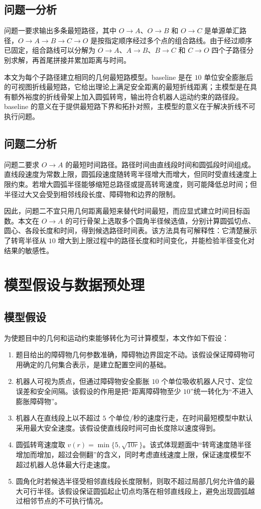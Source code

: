 \documentclass[UTF8,a4paper,12pt]{ctexart}
\begin{document}
\subsection{问题一分析}
问题一要求输出多条最短路径，其中 $O\to A$、$O\to B$ 和 $O\to C$ 是单源单汇路径，$O\to A\to B\to C\to O$ 是按指定顺序经过多个点的组合路线。由于经过顺序已固定，组合路线可以分解为 $O\to A$、$A\to B$、$B\to C$ 和 $C\to O$ 四个子路径分别求解，再首尾拼接并累加距离与时间。

本文为每个子路径建立相同的几何最短路模型。baseline 是在 $10$ 单位安全膨胀后的可视图折线最短路，它给出理论上满足安全距离的最短折线距离；主模型是在具有额外裕度的折线骨架上加入圆弧转弯，输出符合机器人运动约束的路径段。baseline 的意义在于提供最短路下界和拓扑对照，主模型的意义在于解决折线不可执行问题。

\subsection{问题二分析}
问题二要求 $O\to A$ 的最短时间路径。路径时间由直线段时间和圆弧段时间组成。直线段速度为常数上限，圆弧段速度随转弯半径增大而增大，但同时受直线速度上限约束。若增大圆弧半径能够缩短总路径或提高转弯速度，则可能降低总时间；但半径过大又会受到相邻线段长度、障碍物和边界的限制。

因此，问题二不宜只用几何距离最短来替代时间最短，而应显式建立时间目标函数。本文在 $O\to A$ 的可行骨架上选取多个圆角半径候选值，分别计算圆弧切点、圆心、各段长度和时间，得到候选路径时间表。该方法具有可解释性：它清楚展示了转弯半径从 $10$ 增大到上限过程中的路径长度和时间变化，并能检验半径变化对结果的敏感性。

\section{模型假设与数据预处理}
\subsection{模型假设}
为使题目中的几何和运动约束能够转化为可计算模型，本文作如下假设：
\begin{enumerate}[label=H\arabic*：]
    \item 题目给出的障碍物几何参数准确，障碍物边界固定不动。该假设保证障碍物可用确定的几何集合表示，是建立配置空间的基础。
    \item 机器人可视为质点，但通过障碍物安全膨胀 $10$ 个单位吸收机器人尺寸、定位误差和安全间隔。该假设的作用是把“距离障碍物至少 $10$”统一转化为“不进入膨胀障碍物”。
    \item 机器人在直线段上以不超过 $5$ 个单位/秒的速度行走，在时间最短模型中默认采用最大安全速度。该假设使直线段时间可由长度除以速度得到。
    \item 圆弧转弯速度取 $v(r)=\min\{5,\sqrt{10r}\}$。该式体现题面中“转弯速度随半径增加而增加，超过会侧翻”的含义，同时考虑直线速度上限，保证速度模型不超过机器人总体最大行走速度。
    \item 圆角化时若候选半径受相邻直线段长度限制，则取不超过局部几何允许值的最大可行半径。该假设保证圆弧起止切点均落在相邻直线段上，避免出现圆弧越过相邻节点的不可执行情况。
\end{enumerate}
\end{document}
